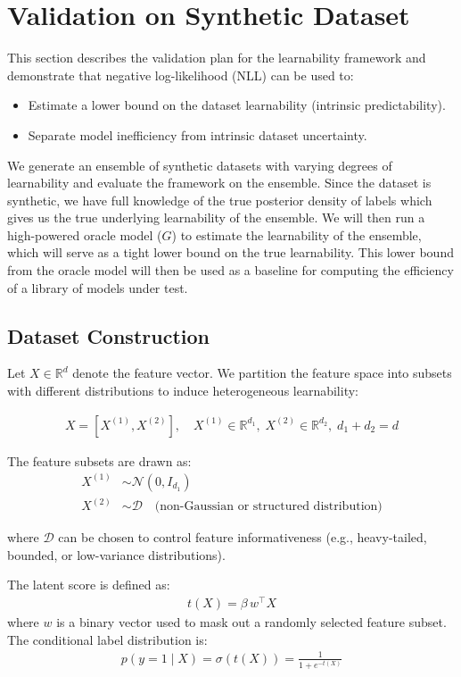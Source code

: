 \documentclass{article}
\begin{document}
\section{Validation on Synthetic Dataset}
This section describes the validation plan for the learnability framework
and demonstrate that negative log-likelihood (NLL) can be used to:
\begin{itemize}
\item Estimate a lower bound on the dataset learnability (intrinsic predictability).
\item Separate model inefficiency from intrinsic dataset uncertainty.
\end{itemize}
We generate an ensemble of synthetic datasets with varying degrees of learnability
and evaluate the framework on the ensemble. Since the dataset is synthetic, we have
full knowledge of the true posterior density of labels which gives us the true
underlying learnability of the ensemble. We will then run a high-powered
oracle model ($G$) to estimate the learnability of the ensemble, which will serve as a 
tight lower bound on the true learnability. This lower bound from the
oracle model will then be used as a baseline for computing the efficiency of a library of 
models under test.

\subsection{Dataset Construction}\label{subsec:DatasetConstruction}
Let $X \in \mathbb{R}^d$ denote the feature vector. 
We partition the feature space into subsets with different distributions to induce heterogeneous learnability:

\begin{align*}
    X = [X^{(1)}, X^{(2)}], \quad 
    X^{(1)} \in \mathbb{R}^{d_1}, \; X^{(2)} \in \mathbb{R}^{d_2}, \; d_1 + d_2 = d
\end{align*}

The feature subsets are drawn as:
\begin{align*}
    X^{(1)} &\sim \mathcal{N}(0, I_{d_1}) \\
    X^{(2)} &\sim \mathcal{D} \quad \text{(non-Gaussian or structured distribution)}
\end{align*}

where $\mathcal{D}$ can be chosen to control feature informativeness (e.g., heavy-tailed, bounded, or low-variance distributions).

The latent score is defined as:
\begin{align*}
    t(X) = \beta\, w^\top X
\end{align*}
where $w$ is a binary vector used to mask out a randomly selected feature subset.
The conditional label distribution is:
\begin{align*}
    p(y=1 \mid X) = \sigma(t(X)) = \frac{1}{1 + e^{-t(X)}}
\end{align*}
\end{document}
